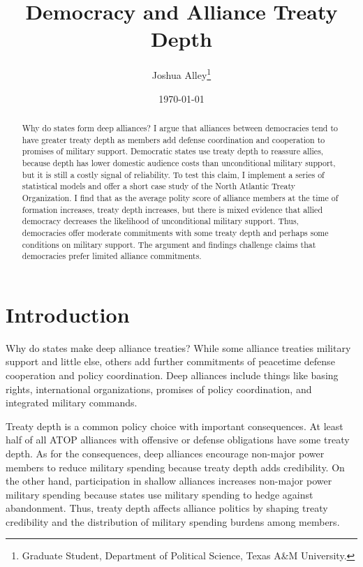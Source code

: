 \documentclass[12pt]{article}
\title{\textbf{Democracy and Alliance Treaty Depth}}
\author{Joshua Alley\footnote{Graduate Student,
Department of Political Science, Texas A\&M University.}}
\date{\today}
\begin{document}
\maketitle 

\doublespace 

\begin{abstract}
Why do states form deep alliances? 
I argue that alliances between democracies tend to have greater treaty depth as members add defense coordination and cooperation to promises of military support. 
Democratic states use treaty depth to reassure allies, because depth has lower domestic audience costs than unconditional military support, but it is still a costly signal of reliability.
To test this claim, I implement a series of statistical models and offer a short case study of the North Atlantic Treaty Organization.
I find that as the average polity score of alliance members at the time of formation increases, treaty depth increases, but there is mixed evidence that allied democracy decreases the likelihood of unconditional military support. 
Thus, democracies offer moderate commitments with some treaty depth and perhaps some conditions on military support. 
The argument and findings challenge claims that democracies prefer limited alliance commitments. 
\end{abstract}


\newpage 


\section{Introduction}


Why do states make deep alliance treaties? 
While some alliance treaties military support and little else, others add further commitments of peacetime defense cooperation and policy coordination. 
Deep alliances include things like basing rights, international organizations, promises of policy coordination, and integrated military commands. 


Treaty depth is a common policy choice with important consequences. 
At least half of all ATOP alliances with offensive or defense obligations have some treaty depth.
As for the consequences, deep alliances encourage non-major power members to reduce military spending because treaty depth adds credibility.  
On the other hand, participation in shallow alliances increases non-major power military spending because states use military spending to hedge against abandonment.
Thus, treaty depth affects alliance politics by shaping treaty credibility and the distribution of military spending burdens among members. 
\end{document}
